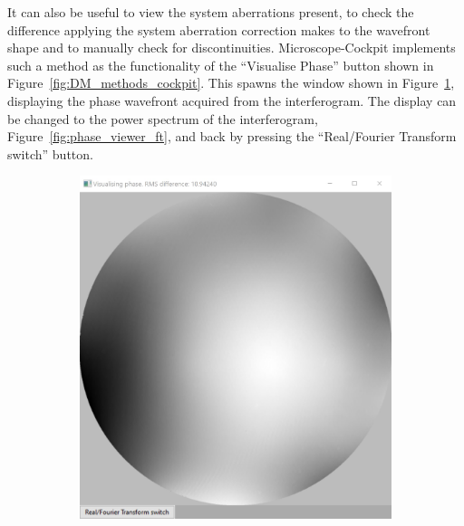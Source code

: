It can also be useful to view the system aberrations present, to check the difference applying the system aberration correction makes to the wavefront shape and to manually check for discontinuities. Microscope-Cockpit implements such a method as the functionality of the ``Visualise Phase'' button shown in Figure~\ref{fig:DM_methods_cockpit}. This spawns the window shown in Figure~\ref{fig:phase_viewer_phase}, displaying the phase wavefront acquired from the interferogram. The display can be changed to the power spectrum of the interferogram, Figure~\ref{fig:phase_viewer_ft}, and back by pressing the ``Real/Fourier Transform switch'' button. 

\begin{figure}[h]
	\centering
	\begin{subfigure}{0.45\textwidth}
		\centering
		\includegraphics[width=1\linewidth, scale=0.5]{images/phase_viewer_phase.jpg}
		\caption{}
		\label{fig:phase_viewer_phase}
	\end{subfigure}
	\begin{subfigure}{0.45\textwidth}
		\centering

\end{subfigure}
\end{figure}
